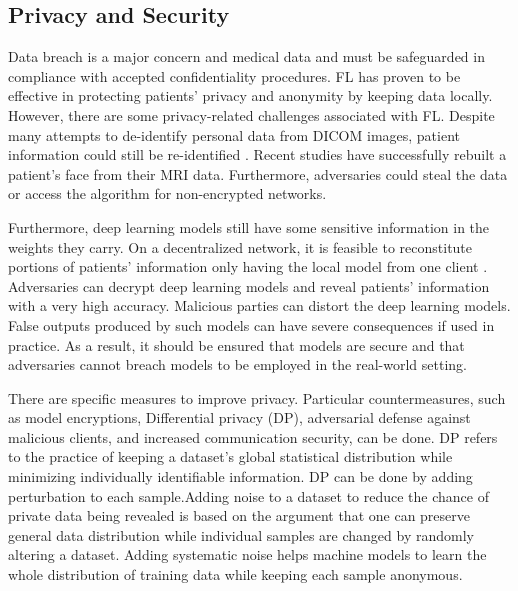 \subsection{Privacy and Security}
Data breach is a major concern and medical data and must be safeguarded in compliance with accepted confidentiality procedures. FL has proven to be effective in protecting patients' privacy and anonymity by keeping data locally. However, there are some privacy-related challenges associated with FL. Despite many attempts to de-identify personal data from DICOM images, patient information could still be re-identified\cite{Peter2015Free} \cite{monteiro2015machine}. Recent studies have successfully rebuilt a patient's face from their MRI data. Furthermore, adversaries could steal the data or access the algorithm for non-encrypted networks. 


Furthermore, deep learning models still have some sensitive information in the weights they carry. On a decentralized network, it is feasible to reconstitute portions of patients' information only having the local model from one client\cite{carlini2019secret} \cite{zhang2020secret}
\cite{hitaj2017deep}. Adversaries can decrypt deep learning models and reveal patients' information with a very high accuracy\cite{fredrikson2015model}. Malicious parties can distort the deep learning models. False outputs produced by such models can have severe consequences if used in practice. As a result, it should be ensured that models are secure and that adversaries cannot breach models to be employed in the real-world setting\cite{tomsett2019model}.



There are specific measures to improve privacy. Particular countermeasures, such as model encryptions, Differential privacy (DP), \cite{abadi2016deep} adversarial defense against malicious clients,\cite{hitaj2017deep} and increased communication security, can be done. DP refers to the practice of keeping a dataset's global statistical distribution while minimizing individually identifiable information. DP can be done by adding perturbation to each sample.Adding noise to a dataset to reduce the chance of private data being revealed is based on the argument that one can preserve general data distribution while individual samples are changed by randomly altering a dataset. Adding systematic noise helps machine models to learn the whole distribution of training data while keeping each sample anonymous.


